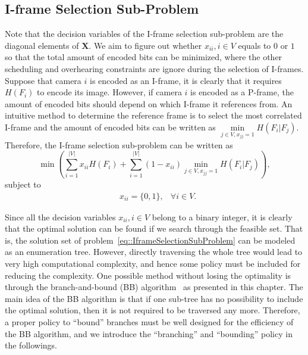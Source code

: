 \subsection{I-frame Selection Sub-Problem}
\label{sec::iFrameSelectionSubProb}
Note that the decision variables of the I-frame selection sub-problem are the diagonal elements of $\mathbf{X}$.
We aim to figure out whether ${x_{ii},i \in V}$ equals to $0$ or $1$ so that the total amount of encoded bits can be minimized, where the other scheduling and overhearing constraints are ignore during the selection of I-frames.
Suppose that camera $i$ is encoded as an I-frame, it is clearly that it requires $H(F_i)$ to encode its image.
However, if camera $i$ is encoded as a P-frame, the amount of encoded bits should depend on which I-frame it references from.
An intuitive method to determine the reference frame is to select the most correlated I-frame and the amount of encoded bits can be written as $\underset{j \in V, x_{jj}=1}{\min} H(F_i|F_j)$.
Therefore, the I-frame selection sub-problem can be written as
\begin{equation*}
\min \left(
\sum_{i=1}^{|V|} x_{ii}H(F_i) +
\sum_{i=1}^{|V|} (1-x_{ii}) \underset{j \in V, x_{jj}=1}{\min} H(F_i|F_j) \right),
\end{equation*}
subject to
\begin{align}
&x_{ii} = \{0,1\}, &\forall i \in V.
\label{eq::IframeSelectionSubProblem}
\end{align}

Since all the decision variables ${x_{ii},i \in V}$ belong to a binary integer, it is clearly that the optimal solution can be found if we search through the feasible set.
That is, the solution set of problem~\eqref{eq::IframeSelectionSubProblem} can be modeled as an enumeration tree.
However, directly traversing the whole tree would lead to very high computational complexity, and hence some policy must be included for reducing the complexity.
One possible method without losing the optimality is through the branch-and-bound (BB) algorithm~\cite{BB} as presented in this chapter.
The main idea of the BB algorithm is that if one sub-tree has no possibility to include the optimal solution, then it is not required to be traversed any more.
Therefore, a proper policy to ``bound'' branches must be well designed for the efficiency of the BB algorithm, and we introduce the ``branching'' and ``bounding'' policy in the followings.
%
